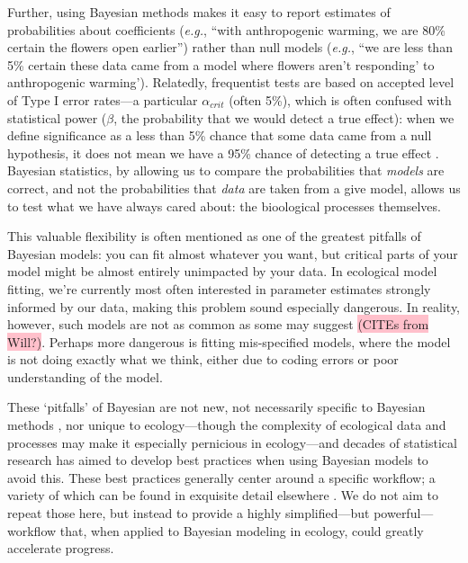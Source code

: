 \documentclass[11pt]{article}
\begin{document}
{%
Further, using Bayesian methods makes it easy to report estimates of probabilities about coefficients (\emph{e.g.}, ``with anthropogenic warming, we are 80\% certain the flowers open earlier'') rather than null models (\emph{e.g.}, ``we are less than 5\% certain these data came from a model where flowers aren't responding' to anthropogenic warming'). Relatedly, frequentist tests are based on accepted level of Type I error rates---a particular $\alpha_{crit}$ (often 5\%), which is often confused with statistical power ($\beta$, the probability that we would detect a true effect): when we define significance as a less than 5\% chance that some data came from a null hypothesis, it does not mean we have a 95\% chance of detecting a true effect \citep[indeed statistical power is often extremely low in ecological studies,][]{jennions2003survey}. Bayesian statistics, by allowing us to compare the probabilities that \emph{models} are correct, and not the probabilities that \emph{data} are taken from a give model, allows us to test what we have always cared about: the bioological processes themselves.

This valuable flexibility is often mentioned as one of the greatest pitfalls of Bayesian models: you can fit almost whatever you want, but critical parts of your model might be almost entirely unimpacted by your data. In ecological model fitting, we're currently most often interested in parameter estimates strongly informed by our data, making this problem sound especially dangerous. In reality, however, such models are not as common as some may suggest \colorbox{pink}{(CITEs from Will?)}. Perhaps more dangerous is fitting mis-specified models, where the model is not doing exactly what we think, either due to coding errors or poor understanding of the model. 

These `pitfalls' of Bayesian are not new, not necessarily specific to Bayesian methods \citep{low2014rising}, nor unique to ecology---though the complexity of ecological data and processes may make it especially pernicious in ecology---and decades of statistical research has aimed to develop best practices when using Bayesian models to avoid this. These best practices generally center around a specific workflow; a variety of which can be found in exquisite detail elsewhere \citep{betanworkflow,grinsztajn2021,vandeschoot2021}. We do not aim to repeat those here, but instead to provide a highly simplified---but powerful---workflow that, when applied to Bayesian modeling in ecology, could greatly accelerate progress. %

}
\end{document}
